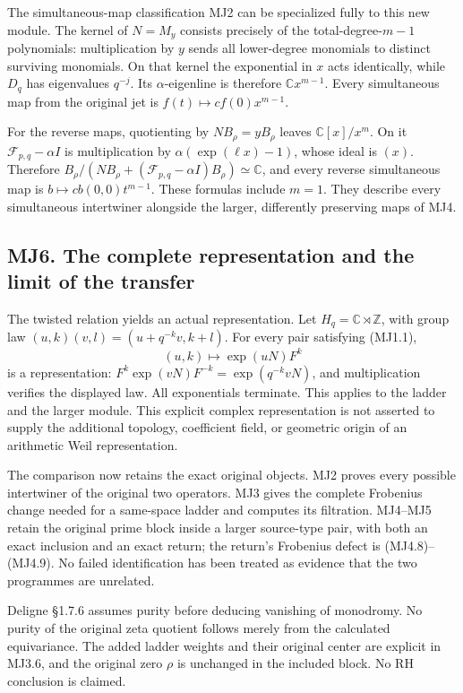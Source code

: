 The simultaneous-map classification MJ2 can be specialized fully to this
new module. The kernel of \(N=M_y\) consists precisely of the
total-degree-\(m-1\) polynomials: multiplication by \(y\) sends all
lower-degree monomials to distinct surviving monomials. On that kernel
the exponential in \(x\) acts identically, while \(D_q\) has eigenvalues
\(q^{-j}\). Its \(\alpha\)-eigenline is therefore \(\mathbb Cx^{m-1}\).
Every simultaneous map from the original jet is
\(f(t)\mapsto cf(0)x^{m-1}\).

For the reverse maps, quotienting by \(NB_\rho=yB_\rho\) leaves
\(\mathbb C[x]/x^m\). On it \(\mathcal F_{p,q}-\alpha I\) is
multiplication by \(\alpha(\exp(\ell x)-1)\), whose ideal is \((x)\).
Therefore
\(B_\rho/(NB_\rho+(\mathcal F_{p,q}-\alpha I)B_\rho)\simeq\mathbb C\),
and every reverse simultaneous map is \(b\mapsto cb(0,0)t^{m-1}\). These
formulas include \(m=1\). They describe every simultaneous intertwiner
alongside the larger, differently preserving maps of MJ4.

\subsection{MJ6. The complete representation and the limit of the
transfer}\label{mj6.-the-complete-representation-and-the-limit-of-the-transfer}

The twisted relation yields an actual representation. Let
\(H_q=\mathbb C\rtimes\mathbb Z\), with group law
\((u,k)(v,l)=(u+q^{-k}v,k+l)\). For every pair satisfying (MJ1.1), \[
(u,k)\longmapsto\exp(uN)F^k
\tag{MJ6.1}
\] is a representation: \(F^k\exp(vN)F^{-k}=\exp(q^{-k}vN)\), and
multiplication verifies the displayed law. All exponentials terminate.
This applies to the ladder and the larger module. This explicit complex
representation is not asserted to supply the additional topology,
coefficient field, or geometric origin of an arithmetic Weil
representation.

The comparison now retains the exact original objects. MJ2 proves every
possible intertwiner of the original two operators. MJ3 gives the
complete Frobenius change needed for a same-space ladder and computes
its filtration. MJ4--MJ5 retain the original prime block inside a larger
source-type pair, with both an exact inclusion and an exact return; the
return's Frobenius defect is (MJ4.8)--(MJ4.9). No failed identification
has been treated as evidence that the two programmes are unrelated.

Deligne §1.7.6 assumes purity before deducing vanishing of monodromy. No
purity of the original zeta quotient follows merely from the calculated
equivariance. The added ladder weights and their original center are
explicit in MJ3.6, and the original zero \(\rho\) is unchanged in the
included block. No RH conclusion is claimed.

